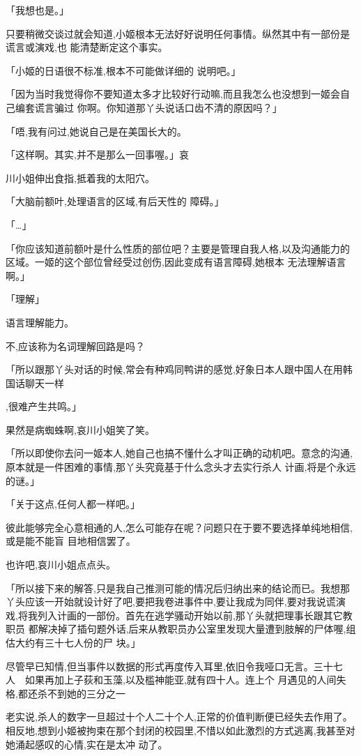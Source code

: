 \documentclass{article}
\begin{document}
「我想也是。」 

只要稍微交谈过就会知道,小姬根本无法好好说明任何事情。纵然其中有一部份是谎言或演戏,也
能清楚断定这个事实。 

「小姬的日语很不标准,根本不可能做详细的
说明吧。」 

「因为当时我觉得你不要知道太多才比较好行动嘛,而且我怎么也没想到一姬会自己编套谎言骗过
你啊。你知道那丫头说话口齿不清的原因吗？」 

「唔,我有问过,她说自己是在美国长大的。

「这样啊。其实,并不是那么一回事喔。」哀
\newpage

川小姐伸出食指,抵着我的太阳穴。 

「大脑前额叶,处理语言的区域,有后天性的
障碍。」 


「…」 

「你应该知道前额叶是什么性质的部位吧？主要是管理自我人格,以及沟通能力的区域。一姬的这个部位曾经受过创伤,因此变成有语言障碍,她根本
无法理解语言啊。」 


「理解」 


语言理解能力。 


不,应该称为名词理解回路是吗？ 

「所以跟那丫头对话的时候,常会有种鸡同鸭讲的感觉,好象日本人跟中国人在用韩国话聊天一样

\newpage
,很难产生共鸣。」 


果然是病蜘蛛啊,哀川小姐笑了笑。 

「所以即使你去问一姬本人,她自己也搞不懂什么才叫正确的动机吧。意念的沟通,原本就是一件困难的事情,那丫头究竟基于什么念头才去实行杀人
计画,将是个永远的谜。」 


「关于这点,任何人都一样吧。」 

彼此能够完全心意相通的人,怎么可能存在呢？问题只在于要不要选择单纯地相信,或是能不能盲
目地相信罢了。 


也许吧,哀川小姐点点头。 

「所以接下来的解答,只是我自己推测可能的情况后归纳出来的结论而已。我想那丫头应该一开始就设计好了吧,要把我卷进事件中,要让我成为同伴,要对我说谎演戏,将我列入计画的一部份。首先在逃学骚动开始以前,那丫头就把理事长跟其它教职员
\newpage
都解决掉了插句题外话,后来从教职员办公室里发现大量遭到肢解的尸体喔,组估大约有三十七人份的尸
块。」 


尽管早已知情,但当事件以数据的形式再度传入耳里,依旧令我哑口无言。三十七人~~如果再加上子荻和玉藻,以及槛神能亚,就有四十人。连上个
月遇见的人间失格,都还杀不到她的三分之一 

老实说,杀人的数字一旦超过十个人二十个人,正常的价值判断便已经失去作用了。相反地,想到小姬被拘束在那个封闭的校园里,不惜以如此激烈的方式逃离,我甚至对她涌起感叹的心情,实在是太冲
动了。 
\end{document}
